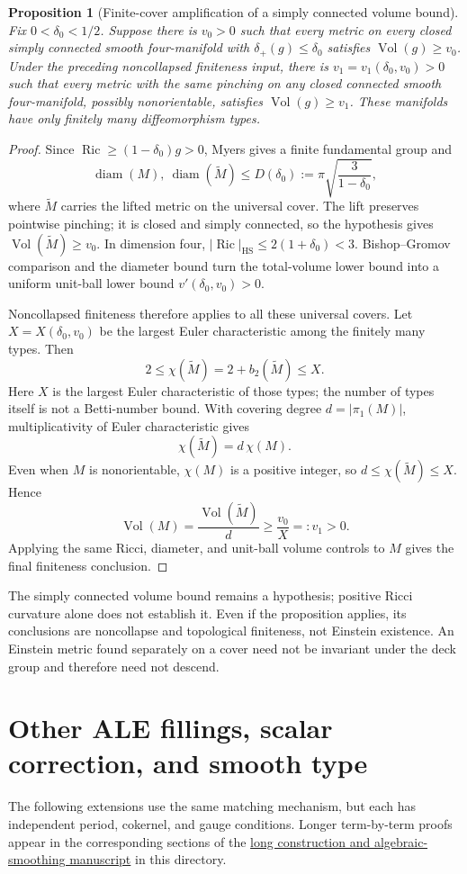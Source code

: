 \documentclass[a4paper,11pt]{article}
\numberwithin{equation}{section}
\newtheorem{proposition}[theorem]{Proposition}
\theoremstyle{definition}
\newcommand{\Ric}{\operatorname{Ric}}
\newcommand{\Vol}{\operatorname{Vol}}
\newcommand{\diam}{\operatorname{diam}}
\begin{document}
\begin{proposition}[Finite-cover amplification of a simply connected volume bound]
Fix $0<\delta_0<1/2$. Suppose there is $v_0>0$ such that every metric on every closed simply connected smooth four-manifold with $\delta_+(g)\le\delta_0$ satisfies $\Vol(g)\ge v_0$. Under the preceding noncollapsed finiteness input, there is $v_1=v_1(\delta_0,v_0)>0$ such that every metric with the same pinching on any closed connected smooth four-manifold, possibly nonorientable, satisfies $\Vol(g)\ge v_1$. These manifolds have only finitely many diffeomorphism types.
\end{proposition}
\begin{proof}
Since $\Ric\ge(1-\delta_0)g>0$, Myers gives a finite fundamental group and
\[
\diam(M),\ \diam(\widetilde M)\le
D(\delta_0):=\pi\sqrt{\frac3{1-\delta_0}},
\]
where $\widetilde M$ carries the lifted metric on the universal cover. The lift preserves pointwise pinching; it is closed and simply connected, so the hypothesis gives $\Vol(\widetilde M)\ge v_0$. In dimension four,
$|\Ric|_{\mathrm{HS}}\le2(1+\delta_0)<3$. Bishop--Gromov comparison and the diameter bound turn the total-volume lower bound into a uniform unit-ball lower bound $v'(\delta_0,v_0)>0$.

Noncollapsed finiteness therefore applies to all these universal covers. Let $X=X(\delta_0,v_0)$ be the largest Euler characteristic among the finitely many types. Then
\[
2\le\chi(\widetilde M)=2+b_2(\widetilde M)\le X.
\]
Here $X$ is the largest Euler characteristic of those types; the number of types itself is not a Betti-number bound. With covering degree $d=|\pi_1(M)|$, multiplicativity of Euler characteristic gives
\[
\chi(\widetilde M)=d\,\chi(M).
\]
Even when $M$ is nonorientable, $\chi(M)$ is a positive integer, so $d\le\chi(\widetilde M)\le X$. Hence
\[
\Vol(M)=\frac{\Vol(\widetilde M)}d\ge\frac{v_0}{X}=:v_1>0.
\]
Applying the same Ricci, diameter, and unit-ball volume controls to $M$ gives the final finiteness conclusion.
\end{proof}
The simply connected volume bound remains a hypothesis; positive Ricci curvature alone does not establish it. Even if the proposition applies, its conclusions are noncollapse and topological finiteness, not Einstein existence. An Einstein metric found separately on a cover need not be invariant under the deck group and therefore need not descend.

\section{Other ALE fillings, scalar correction, and smooth type}\label{sec:ALE-extensions}
The following extensions use the same matching mechanism, but each has independent period, cokernel, and gauge conditions.
Longer term-by-term proofs appear in the corresponding sections of
the \href{20260912.tex}{long construction and algebraic-smoothing manuscript} in this directory.
\end{document}
